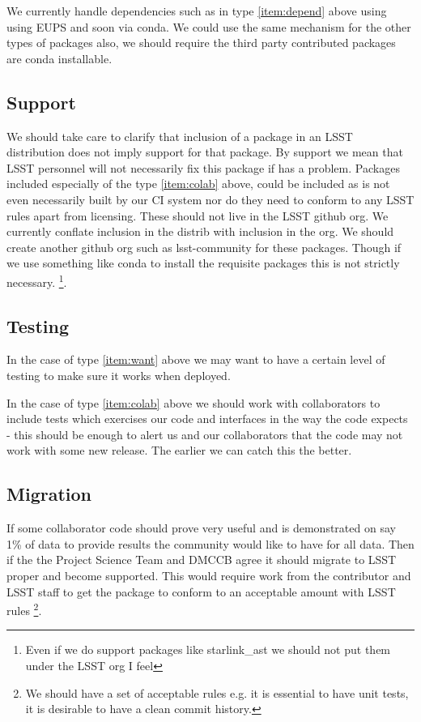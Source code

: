 We currently handle dependencies such as in type \ref{item:depend} above using using EUPS and soon via conda. We could use the same mechanism for the other types of packages also,
we should require the third party contributed packages are conda installable.

\subsection{Support}\label{sec:support}
We should take care to clarify that inclusion of a package in an LSST distribution does not imply support for that package.
By support we mean that LSST personnel will not necessarily fix this package if has a problem.
Packages included especially of the type \ref{item:colab} above, could be included as is not even necessarily built by our CI system nor do they need to conform to any LSST rules apart from licensing.
These should not live in the LSST github org. We currently conflate inclusion in the distrib with inclusion in the org.
We should create another github org such as lsst-community for these packages. Though if we use something like conda to install the requisite packages this is not strictly necessary.
\footnote{Even if we do support packages like starlink\_ast we should not put them under the LSST org I feel}.

\subsection{Testing} \label{sec:p3test}
In the case of type \ref{item:want} above we may want to have a certain level of testing to make sure it works when deployed.

In the case of type \ref{item:colab} above we should work with collaborators to include tests which exercises our code and interfaces in the way the code expects - this should be enough to alert us and our collaborators that the code may not work with some new release. The earlier we can catch this the better.
\subsection{Migration}\label{sec:migration}
If some collaborator code should prove very useful and is demonstrated  on say 1\% of data to provide results the community would like to have for all data. Then if the the Project Science Team and DMCCB agree it should migrate to LSST proper and become supported. This would require work from the contributor and LSST staff to get the package to conform to an acceptable amount with LSST rules \footnote{We should have a set of acceptable rules e.g. it is essential to have unit tests, it is desirable to have a clean commit history.}.
